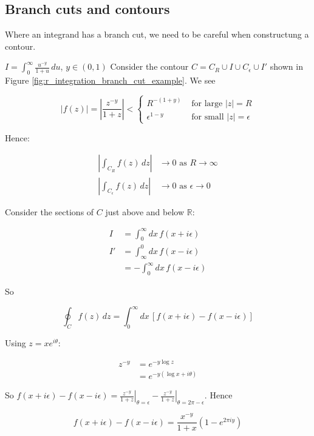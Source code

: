 \documentclass{physics_notes}
\begin{document}
\subsection{Branch cuts and contours }

Where an integrand has a branch cut, we need to be careful when constructung a contour. 

\begin{example}{$I = \int_0^\infty \frac{u^{-y}}{1+u}\, du$, $y\in(0,1)$}
	Consider the contour $C = C_R \cup I \cup C_\epsilon \cup I'$ shown in Figure \ref{fig:r_integration_branch_cut_example}. We see

	\[
		|f(z)| = \left|\frac{z^{-y}}{1+z}\right| < \begin{cases}
			R^{-(1+y)} & \text{ for large } |z| = R \\
			\epsilon^{1-y} & \text{ for small } |z| = \epsilon
		\end{cases}
	\]

	Hence:

	\begin{align*}
		\left|\int_{C_R} f(z)\, dz \right| &\to 0 \text{ as } R \to\infty \\
		\left|\int_{C_\epsilon} f(z)\, dz \right| &\to 0 \text{ as } \epsilon \to 0
	\end{align*}

	Consider the sections of $C$ just above and below $\mathbb{R}$:

	\begin{align*}
		I &= \int_0^\infty dx\, f(x+i\epsilon) \\
		I' &= \int_\infty^0 dx\, f(x-i\epsilon) \\
		&= -\int_0^\infty dx\, f(x-i\epsilon)
	\end{align*}

	So 

	\[
		\oint_C f(z)\, dz = \int_0^\infty dx\, \left[f(x+i\epsilon) - f(x-i\epsilon)\right]
	\]

	Using $z = xe^{i\theta}$:

	\begin{align*}
		z^{-y} &= e^{-y\log{z}} \\
		&= e^{-y(\log{x} + i\theta)}
	\end{align*}

	So $f(x+i\epsilon) - f(x-i\epsilon) = \left.\frac{z^{-y}}{1+z}\right|_{\theta=\epsilon}- \left.\frac{z^{-y}}{1+z}\right|_{\theta = 2\pi -\epsilon}$. Hence

	\[
		f(x+i\epsilon) - f(x-i\epsilon) = \frac{x^{-y}}{1+x}\left(1-e^{2\pi iy}\right)
	\]


\end{example}
\end{document}
